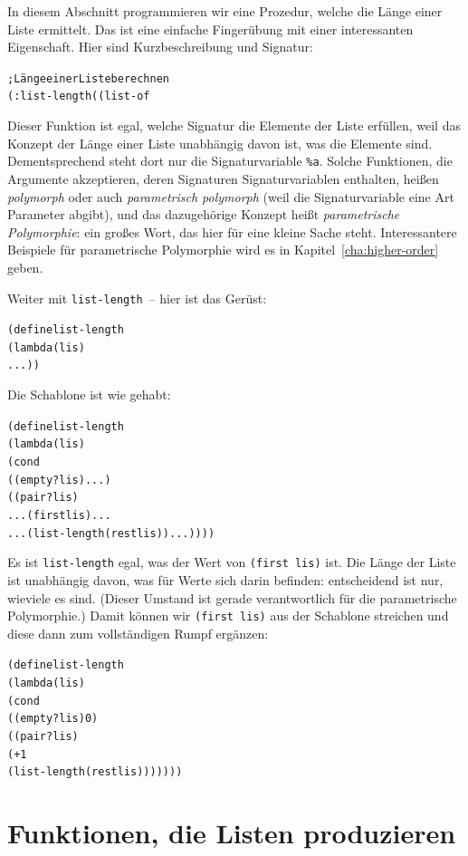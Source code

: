 In diesem Abschnitt programmieren wir eine Prozedur, welche die Länge
einer Liste ermittelt. Das ist
eine einfache Fingerübung mit einer interessanten Eigenschaft.  Hier
sind Kurzbeschreibung und Signatur:
%
\begin{alltt}
; Länge einer Liste berechnen
(: list-length ((list-of %
\end{alltt}
%
Dieser Funktion ist egal, welche Signatur
die Elemente der Liste erfüllen, weil das Konzept der Länge einer
Liste unabhängig davon ist, was die Elemente sind.
Dementsprechend steht dort nur die Signaturvariable \verb|%a|.
Solche Funktionen, die Argumente akzeptieren, deren Signaturen
Signaturvariablen enthalten, heißen \textit{polymorph} oder auch
\textit{parametrisch polymorph} (weil die Signaturvariable eine Art
Parameter abgibt), und das dazugehörige Konzept heißt
\textit{parametrische
  Polymorphie}:
ein großes Wort, das hier für eine kleine Sache steht.  Interessantere
Beispiele für parametrische Polymorphie wird es in
Kapitel~\ref{cha:higher-order} geben.

Weiter mit \texttt{list-length}~-- hier ist das Gerüst:
%
\begin{alltt}
(define list-length
  (lambda (lis)
    ...))
\end{alltt}
%
Die Schablone ist wie gehabt:
%
\begin{alltt}
(define list-length
  (lambda (lis)
    (cond
      ((empty? lis) ...)
      ((pair? lis) 
       ... (first lis) ...
       ... (list-length (rest lis)) ...))))
\end{alltt}
%
Es ist \texttt{list-length} egal, was der Wert von \texttt{(first
  lis)} ist.  Die Länge der Liste ist unabhängig davon, was für Werte
sich darin befinden: entscheidend ist nur, wieviele es sind.  (Dieser
Umstand ist gerade verantwortlich für die parametrische Polymorphie.)
Damit können wir \texttt{(first lis)} aus der Schablone streichen und
diese dann zum vollständigen Rumpf ergänzen:
%
\begin{alltt}
(define list-length
  (lambda (lis)
    (cond
      ((empty? lis) 0)
      ((pair? lis) 
       (+ 1 
          (list-length (rest lis)))))))
\end{alltt}
%

\section{Funktionen, die Listen produzieren}

